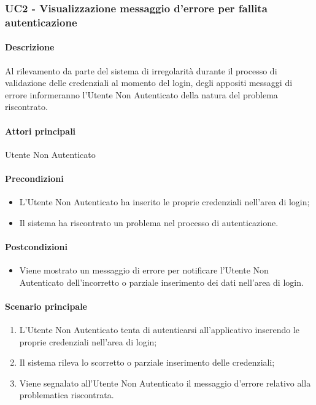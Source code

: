 \subsubsection{UC2 - Visualizzazione messaggio d'errore per fallita autenticazione}\label{UC2}
\paragraph*{Descrizione}
Al rilevamento da parte del sistema di irregolarità durante il processo di validazione delle credenziali al momento del login, degli appositi messaggi di errore informeranno l’Utente Non Autenticato della natura del problema riscontrato.

\paragraph*{Attori principali} Utente Non Autenticato

\paragraph*{Precondizioni}
\begin{itemize}
  \item L’Utente Non Autenticato ha inserito le proprie credenziali nell’area di login;
  \item Il sistema ha riscontrato un problema nel processo di autenticazione.  
\end{itemize}

\paragraph*{Postcondizioni}
\begin{itemize}
  \item Viene mostrato un messaggio di errore per notificare l’Utente Non Autenticato dell’incorretto o parziale inserimento dei dati nell’area di login.
\end{itemize}

\paragraph*{Scenario principale}
\begin{enumerate}
  \item L’Utente Non Autenticato tenta di autenticarsi all’applicativo inserendo le proprie credenziali nell’area di login;
  \item Il sistema rileva lo scorretto o parziale inserimento delle credenziali;
  \item Viene segnalato all’Utente Non Autenticato il messaggio d’errore relativo alla problematica riscontrata.  
\end{enumerate}

